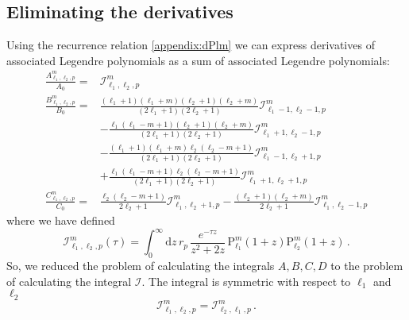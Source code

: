 \documentclass[superscriptaddress,prb]{revtex4-1}
\newcommand{\e}{e}    %
\newcommand{\Plm}[2]{{\text{P}_{#1}^{#2}}}
\begin{document}
\subsection{Eliminating the derivatives}

Using the recurrence relation \eqref{appendix:dPlm} we can express derivatives
of associated Legendre polynomials as a sum of associated Legendre polynomials:
\begin{align}
\frac{A_{\ell_1,\ell_2,p}^{m}}{A_0} =& \mathcal{I}_{\ell_1,\ell_2,p}^{m} \\
\frac{B_{\ell_1,\ell_2,p}^{m}}{B_0} =& \frac{(\ell_1+1)(\ell_1+m)(\ell_2+1)(\ell_2+m)}{(2\ell_1+1)(2\ell_2+1)} \mathcal{I}_{\ell_1-1,\ell_2-1,p}^{m} \nonumber \\
                                     & -\frac{\ell_1(\ell_1-m+1)(\ell_2+1)(\ell_2+m)}{(2\ell_1+1)(2\ell_2+1)} \mathcal{I}_{\ell_1+1,\ell_2-1,p}^{m} \nonumber \\
                                     & - \frac{(\ell_1+1)(\ell_1+m)\ell_2(\ell_2-m+1)}{(2\ell_1+1)(2\ell_2+1)} \mathcal{I}_{\ell_1-1,\ell_2+1,p}^{m} \nonumber \\
                                     & + \frac{\ell_1(\ell_1-m+1)\ell_2(\ell_2-m+1)}{(2\ell_1+1)(2\ell_2+1)} \mathcal{I}_{\ell_1+1,\ell_2+1,p}^{m} \\
\frac{C_{\ell_1,\ell_2,p}^{m}}{C_0} =&  \frac{\ell_2 (\ell_2-m+1)}{2\ell_2+1} \mathcal{I}_{\ell_1,\ell_2+1,p}^{m} - \frac{(\ell_2+1)(\ell_2+m)}{2\ell_2+1} \mathcal{I}_{\ell_1,\ell_2-1,p}^{m}
\end{align}
where we have defined
\begin{equation}
\mathcal{I}_{\ell_1,\ell_2,p}^{m}(\tau) = \int_0^\infty \mathrm{d}z \, r_p \, \frac{\e^{-\tau z}}{z^2+2z} \, \Plm{\ell_1}{m}(1+z) \Plm{\ell_2}{m}(1+z) \,.
\end{equation}
So, we reduced the problem of calculating the integrals $A,B,C,D$ to the
problem of calculating the integral $\mathcal{I}$. The integral is symmetric
with respect to $\ell_1$ and $\ell_2$
\begin{equation}
\mathcal{I}_{\ell_1,\ell_2,p}^{m} = \mathcal{I}_{\ell_2,\ell_1,p}^{m} \,.
\end{equation}
\end{document}
